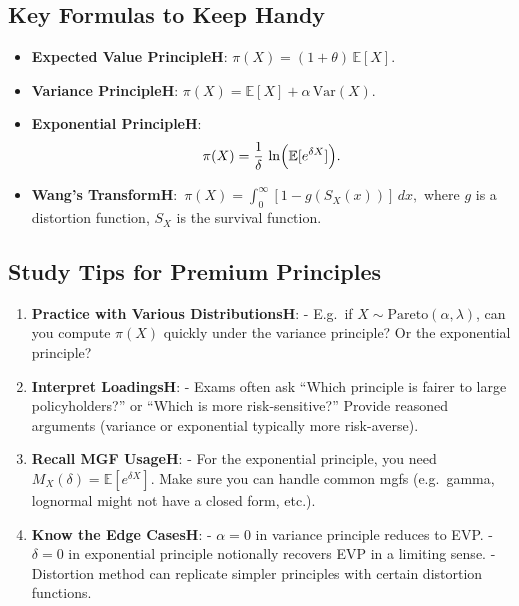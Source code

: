 \documentclass[13pt,a4paper]{article}
\begin{document}
\subsection{Key Formulas to Keep Handy}
\begin{itemize}
  \item \textbf{Expected Value PrincipleH}: \(\pi(X) = (1+\theta)\,\mathbb{E}[X]\).
  \item \textbf{Variance PrincipleH}: \(\pi(X) = \mathbb{E}[X] + \alpha\,\mathrm{Var}(X)\).
  \item \textbf{Exponential PrincipleH}:
    \[
      \pi(X) = \frac{1}{\delta}\,\ln\Bigl(\mathbb{E}[e^{\delta X}]\Bigr).
    \]
  \item \textbf{Wang’s TransformH}: 
    \(\,\pi(X)=\int_0^\infty[1-g(S_X(x))]\,dx,\) 
    where \(g\) is a distortion function, \(S_X\) is the survival function.  
\end{itemize}

\subsection{Study Tips for Premium Principles}
\begin{enumerate}
  \item \textbf{Practice with Various DistributionsH}: 
    - E.g.\ if \(X\sim \mathrm{Pareto}(\alpha,\lambda)\), can you compute \(\pi(X)\) quickly under the variance principle? Or the exponential principle? 
  \item \textbf{Interpret LoadingsH}:
    - Exams often ask “Which principle is fairer to large policyholders?” or “Which is more risk-sensitive?” Provide reasoned arguments (variance or exponential typically more risk-averse).
  \item \textbf{Recall MGF UsageH}:
    - For the exponential principle, you need \(M_X(\delta)=\mathbb{E}[e^{\delta X}]\). Make sure you can handle common mgfs (e.g.\ gamma, lognormal might not have a closed form, etc.).
  \item \textbf{Know the Edge CasesH}:
    - \(\alpha=0\) in variance principle reduces to EVP.  
    - \(\delta=0\) in exponential principle notionally recovers EVP in a limiting sense.  
    - Distortion method can replicate simpler principles with certain distortion functions.
\end{enumerate}
\end{document}
